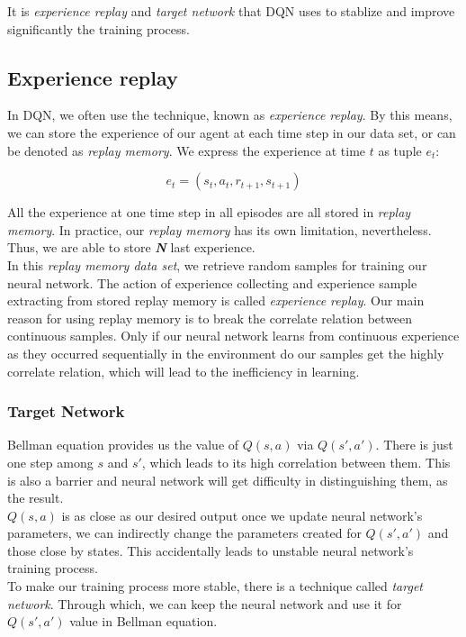 \documentclass{article}
\begin{document}
It is \textit{experience replay} and \textit{target network} that DQN uses to stablize and improve significantly the training process.
\subsection*{Experience replay}
In DQN, we often use the technique, known as \textit{experience replay}. By this means, we can store the experience of our agent at each time step in our data set, or can be denoted as \textit{replay memory}. We express the experience at time $t$ as tuple $e_t$:

$$
e_t = (s_t, a_t, r_{t+1}, s_{t+1})
$$

All the experience at one time step in all episodes are all stored in \textit{replay memory}. In practice, our \textit{replay memory} has its own limitation, nevertheless. Thus, we are able to store \textbf{\textit{N}} last experience. \\

In this \textit{replay memory data set}, we retrieve random samples for training our neural network. The action of experience collecting and experience sample extracting from stored replay memory is called \textit{experience replay}. Our main reason for using replay memory is to break the correlate relation between continuous samples. Only if our neural network learns from continuous experience as they occurred sequentially in the environment do our samples get the highly correlate relation, which will lead to the inefficiency in learning.

\subsubsection*{Target Network}
Bellman equation provides us the value of $Q(s, a)$ via $Q(s', a')$. There is just one step among $s$ and $s'$, which leads to its high correlation between them. This is also a barrier and neural network will get difficulty in distinguishing them, as the result.\\

$Q(s, a)$ is as close as our desired output once we update neural network's parameters, we can indirectly change the parameters created for $Q(s', a')$ and those close by states. This accidentally leads to unstable neural network's training process.\\

To make our training process more stable, there is a technique called \textit{target network}. Through which, we can keep the neural network and use it for $Q(s', a')$ value in Bellman equation.\\
\end{document}
